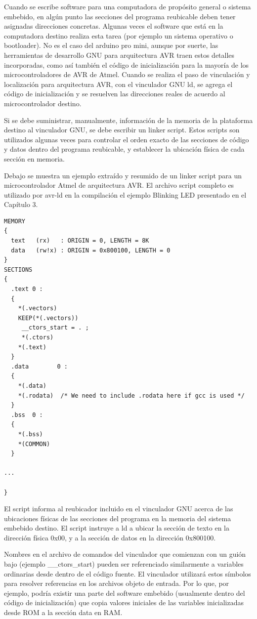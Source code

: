 \documentclass[output=paper, 
colorlinks,
citecolor=brown,
newtxmath
]{langscibook}
\begin{document}
Cuando se escribe software para una computadora de propósito general o
sistema embebido, en algún punto las secciones del programa reubicable
deben tener asignadas direcciones concretas. Algunas veces el software
que está en la computadora destino realiza esta tarea (por ejemplo un sistema
operativo o bootloader). No es el caso del arduino pro mini, aunque por suerte,
las herramientas de desarrollo GNU para arquitectura AVR traen estos detalles 
incorporadas, como así también el código de inicialización para la mayoría
de los microcontroladores de AVR de Atmel.
Cuando se realiza el paso de vinculación y localización para arquitectura AVR,
con el vinculador GNU ld, se agrega el código de inicialización y se 
resuelven las direcciones reales de acuerdo al microcontrolador destino.

Si se debe suministrar, manualmente, información de la memoria de la plataforma destino
al vinculador  GNU, se debe escribir un linker script.
Estos scripts son utilizados algunas veces para controlar el orden exacto de
las secciones de código y datos dentro del programa reubicable, y establecer
la ubicación física de cada sección en memoria.


Debajo se muestra un ejemplo extraído y resumido de un linker script
para un microcontrolador Atmel de arquitectura AVR. El archivo script
completo es utilizado por avr-ld en la compilación el ejemplo Blinking LED
presentado en el Capítulo 3.

\begin{verbatim}
MEMORY
{
  text   (rx)   : ORIGIN = 0, LENGTH = 8K
  data   (rw!x) : ORIGIN = 0x800100, LENGTH = 0
}
SECTIONS
{
  .text 0 :
  {
    *(.vectors)
    KEEP(*(.vectors))
     __ctors_start = . ;
     *(.ctors)
    *(.text)
  }
  .data        0 :
  {
    *(.data)
    *(.rodata)  /* We need to include .rodata here if gcc is used */
  }
  .bss  0 :
  {
    *(.bss)
    *(COMMON)
  }

...

}
\end{verbatim}

El script informa al reubicador incluido en el vinculador GNU acerca de las ubicaciones
físicas de las secciones del programa en la memoria del sistema embebido destino.
El script instruye a ld a ubicar la sección de texto en la dirección física 0x00,
y a la sección de datos en la dirección 0x800100.

Nombres en el archivo de comandos del vinculador que comienzan con un guión bajo
(ejemplo \_\_ctors\_start) pueden ser referenciado similarmente a variables ordinarias
desde dentro de el código fuente. El vinculador utilizará estos símbolos
para resolver referencias en los archivos objeto de entrada.
Por lo que, por ejemplo, podría existir una parte del software embebido (usualmente
dentro del código de inicialización) que copia valores iniciales de las variables
inicializadas desde ROM a la sección data en RAM.
\end{document}
